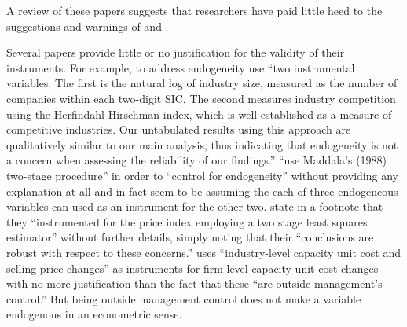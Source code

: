\documentclass[11pt]{amsart}
\begin{document}
A review of these papers suggests that researchers have paid little heed to the suggestions and warnings of  \citet{Larcker:2010fq} and \citet{Roberts:2013cz}.

Several papers provide little or no justification for the validity of their instruments. For example, to address endogeneity \citet{Cohen:2014jl} use ``two instrumental variables. The first is the natural log of industry size, measured as the number of companies within each two-digit SIC. The second measures industry competition using the Herfindahl-Hirschman index, which is well-established as a measure of competitive industries. Our untabulated results using this approach are qualitatively similar to our main analysis, thus indicating that endogeneity is not a concern when assessing the reliability of our findings.''
\citet{Vermeer:2014bs} ``use Maddala's (1988) two-stage procedure'' in order to ``control for endogeneity'' without providing any explanation at all and in fact seem to be assuming the each of three endogeneous variables can used as an instrument for the other two.
\citet[p.48]{Fox:2014io} state in a footnote that they ``instrumented for the price index employing a two stage least squares estimator'' without further details, simply noting that their ``conclusions are robust with respect to these concerns.''
\citet{Cannon:2014im} uses ``industry-level capacity unit cost and selling price changes'' as instruments for firm-level capacity unit cost changes with no more justification than the fact that these ``are outside management's control.'' But being outside management control does not make a variable endogenous in an econometric sense.
\end{document}
